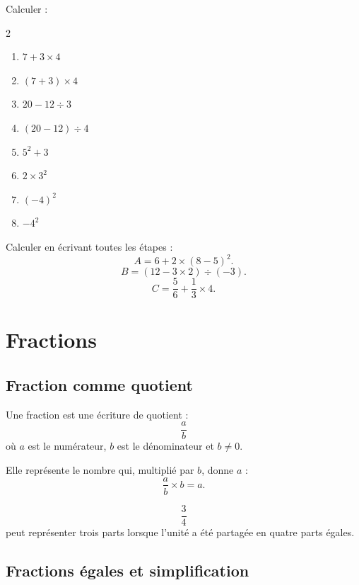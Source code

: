 \documentclass[11pt,a4paper]{article}
\newcounter{exercice}
\begin{document}
\begin{exercice}
Calculer :
\begin{multicols}{2}
\begin{enumerate}[label=\alph*)]
  \item $7+3\times 4$
  \item $(7+3)\times 4$
  \item $20-12\div 3$
  \item $(20-12)\div 4$
  \item $5^2+3$
  \item $2\times 3^2$
  \item $(-4)^2$
  \item $-4^2$
\end{enumerate}
\end{multicols}
\end{exercice}

\begin{exercice}[Méthode]
Calculer en écrivant toutes les étapes :
\[
A=6+2\times(8-5)^2.
\]
\[
B=\left(12-3\times 2\right)\div(-3).
\]
\[
C=\frac{5}{6}+\frac{1}{3}\times 4.
\]
\end{exercice}

\newpage

\section{Fractions}

\subsection{Fraction comme quotient}

\begin{definitionbox}
Une fraction est une écriture de quotient :
\[
\frac{a}{b}
\]
où $a$ est le numérateur, $b$ est le dénominateur et $b\neq 0$.

Elle représente le nombre qui, multiplié par $b$, donne $a$ :
\[
\frac{a}{b}\times b=a.
\]
\end{definitionbox}

\begin{exemple}
\[
\frac{3}{4}
\]
peut représenter trois parts lorsque l'unité a été partagée en quatre parts égales.
\end{exemple}

\subsection{Fractions égales et simplification}
\end{document}
